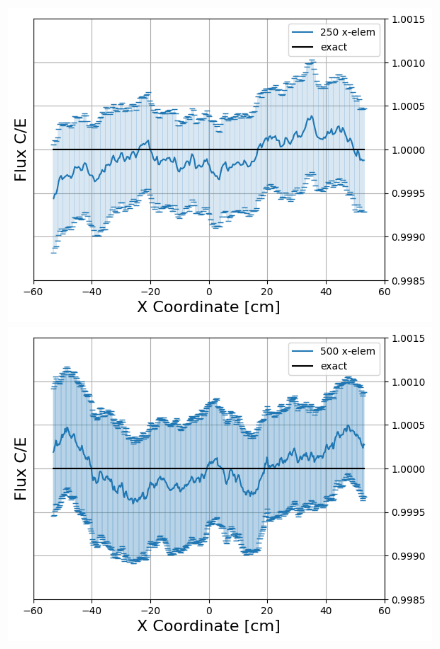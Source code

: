 \documentclass[letterpaper]{mc2023}
\begin{document}
\begin{figure}[H]
\begin{minipage}[b]{0.32\linewidth}
    \end{minipage}
    \begin{minipage}[b]{0.32\linewidth}
        \includegraphics[width=\linewidth]{figures/250_flux_CE_error_bars}
    \end{minipage}
    \begin{minipage}[b]{0.32\linewidth}
        \includegraphics[width=\linewidth]{figures/500_flux_CE_error_bars}
    \end{minipage}
    \begin{minipage}[b]{0.32\linewidth}

\end{minipage}
\end{figure}
\end{document}
